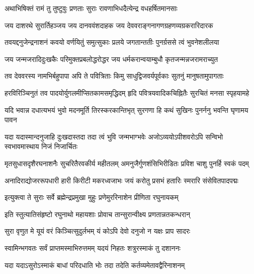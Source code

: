 


\twolineshloka
{अथाभिषिक्तं रामं तु तुष्टुवुः प्रणताः सुराः}
{रावणाभिधदैत्येन्द्र वधहर्षितमानसाः} %


\twolineshloka
{जय दाशरथे सुरार्तिहञ्जय जय दानववंशदाहक}
{जय देववराङ्गनागणग्रहणव्यग्रकरारिदारक} %

\twolineshloka
{तवयद्दनुजेन्द्रनाशनं कवयो वर्णयितुं समुत्सुकाः}
{प्रलये जगतान्ततीः पुनर्ग्रससे त्वं भुवनेशलीलया} %

\twolineshloka
{जय जन्मजरादिदुःखकैः परिमुक्तप्रबलोद्धरोद्धर}
{जय धर्मकरान्वयाम्बुधौ कृतजन्मन्नजरामराच्युत} %

\twolineshloka
{तव देववरस्य नामभिर्बहुपापा अपि ते पवित्रिताः}
{किमु साधुद्विजवर्यपूर्वकाः सुतनुं मानुषतामुपागताः} %

\twolineshloka
{हरविरिञ्चिनुतं तव पादयोर्युगलमीप्सितकामसमृद्धिदम्}
{हृदि पवित्रयवादिकचिह्नितैः सुरचितं मनसा स्पृहयामहे} %

\twolineshloka
{यदि भवान्न दधात्यभयं भुवो मदनमूर्ति तिरस्करकान्तिभृत्}
{सुरगणा हि कथं सुखिनः पुनर्ननु भवन्ति घृणामय पावन} %

\twolineshloka
{यदा यदास्मान्दनुजाहि दुःखदास्तदा तदा त्वं भुवि जन्मभाग्भवेः}
{अजोऽव्ययोऽपीशवरोऽपि सन्विभो स्वभावमास्थाय निजं निजार्चितः} %

\twolineshloka
{मृतसुधासदृशैरघनाशनैः सुचरितैरवकीर्य महीतलम्}
{अमनुजैर्गुणशंसिभिरीडितः प्रविश चाशु पुनर्हि स्वकं पदम्} %

\twolineshloka
{अनादिराद्योजररूपधारी हारी किरीटी मकरध्वजाभः}
{जयं करोतु प्रसभं हतारिः स्मरारि संसेवितपादपद्मः} %

\twolineshloka
{इत्युक्त्वा ते सुराः सर्वे ब्रह्मेन्द्रप्रमुखा मुहुः}
{प्रणेमुररिनाशेन प्रीणिता रघुनायकम्} %

\twolineshloka
{इति स्तुत्यातिसंहृष्टो रघुनाथो महायशाः}
{प्रोवाच तान्सुरान्वीक्ष्य प्रणतान्नतकन्धरान्} %


\twolineshloka
{सुरा वृणुत मे यूयं वरं किञ्चित्सुदुर्लभम्}
{यं कोऽपि देवो दनुजो न यक्षः प्राप सादरः} %


\twolineshloka
{स्वामिन्भगवतः सर्वं प्राप्तमस्माभिरुत्तमम्}
{यदयं निहतः शत्रुरस्माकं तु दशाननः} %

\twolineshloka
{यदा यदाऽसुरोऽस्माकं बाधां परिदधाति भोः}
{तदा तदेति कर्तव्यमेतावद्वैरिनाशनम्} %

